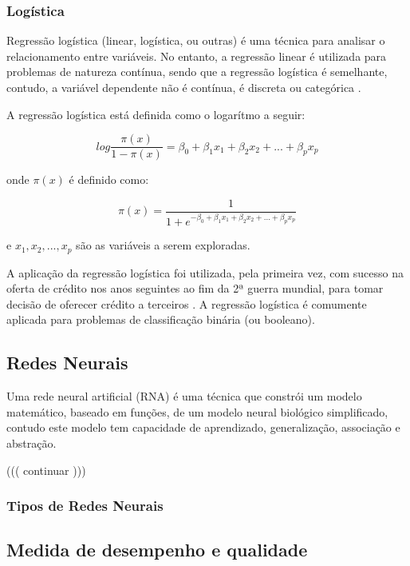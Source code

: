 \subsubsection{Logística}
Regressão logística (linear, logística, ou outras) é uma técnica para analisar o relacionamento entre variáveis. No entanto, a regressão linear é utilizada para problemas de natureza
contínua, sendo que a regressão logística é semelhante, contudo, a variável dependente não é contínua, é discreta ou categórica \cite{DecisaoCredito}.

A regressão logística está definida como o logarítmo a seguir:

\begin{equation}
 log{\frac{\pi(x)}{1-\pi(x)}} = \beta_0 + \beta_1 x_1 + \beta_2 x_2 + ... + \beta_p x_p
\end{equation}

onde $\pi(x)$ é definido como:

\begin{equation}
 \pi(x) = \dfrac{1}{1 + e^{-{\beta_0 + \beta_1 x_1 + \beta_2 x_2 + ... + \beta_p x_p}}}
\end{equation}

e $x_1, x_2,..., x_p$ são as variáveis a serem exploradas.


A aplicação da regressão logística foi utilizada, pela primeira vez, com sucesso na oferta de crédito nos anos seguintes ao fim da 2ª guerra mundial, para tomar decisão 
de oferecer crédito a terceiros \cite{RegrecaoLog}.
A regressão logística é comumente aplicada para problemas de classificação binária (ou booleano).

\pagebreak

\subsection{Redes Neurais}

Uma rede neural artificial (RNA) é uma técnica que constrói um modelo matemático, baseado em funções, de um modelo
neural biológico simplificado, contudo este modelo tem capacidade de aprendizado, generalização, associação e abstração.

((( continuar )))

\subsubsection{Tipos de Redes Neurais}

\pagebreak


\subsection{Medida de desempenho e qualidade}

